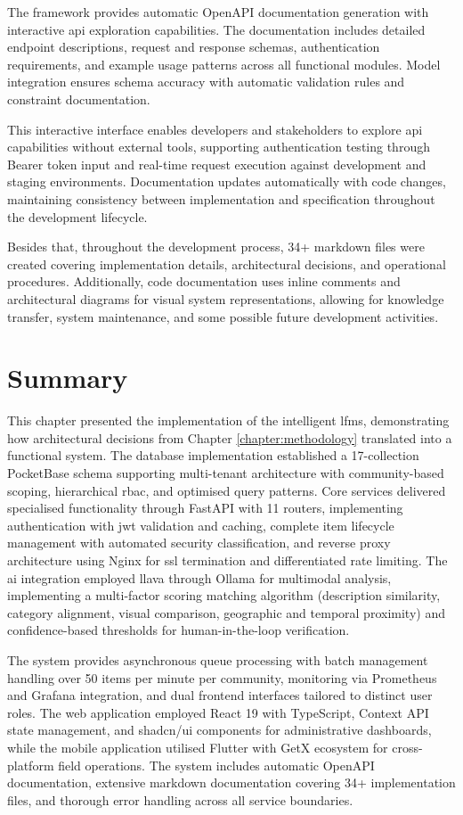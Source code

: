 The framework provides automatic OpenAPI documentation generation with interactive \ac{api} exploration capabilities. The documentation includes detailed endpoint descriptions, request and response schemas, authentication requirements, and example usage patterns across all functional modules. Model integration ensures schema accuracy with automatic validation rules and constraint documentation.

This interactive interface enables developers and stakeholders to explore \ac{api} capabilities without external tools, supporting authentication testing through Bearer token input and real-time request execution against development and staging environments. Documentation updates automatically with code changes, maintaining consistency between implementation and specification throughout the development lifecycle.

Besides that, throughout the development process, 34+ markdown files were created covering implementation details, architectural decisions, and operational procedures. Additionally, code documentation uses inline comments and architectural diagrams for visual system representations, allowing for knowledge transfer, system maintenance, and some possible future development activities.

\section{Summary} \label{section:implementation_summary}

This chapter presented the implementation of the intelligent \ac{lfms}, demonstrating how architectural decisions from Chapter \ref{chapter:methodology} translated into a functional system. The database implementation established a 17-collection PocketBase schema supporting multi-tenant architecture with community-based scoping, hierarchical \ac{rbac}, and optimised query patterns. Core services delivered specialised functionality through FastAPI with 11 routers, implementing authentication with \ac{jwt} validation and caching, complete item lifecycle management with automated security classification, and reverse proxy architecture using Nginx for \ac{ssl} termination and differentiated rate limiting. The \ac{ai} integration employed \ac{llava} through Ollama for multimodal analysis, implementing a multi-factor scoring matching algorithm (description similarity, category alignment, visual comparison, geographic and temporal proximity) and confidence-based thresholds for human-in-the-loop verification.

The system provides asynchronous queue processing with batch management handling over 50 items per minute per community, monitoring via Prometheus and Grafana integration, and dual frontend interfaces tailored to distinct user roles. The web application employed React 19 with TypeScript, Context API state management, and shadcn/ui components for administrative dashboards, while the mobile application utilised Flutter with GetX ecosystem for cross-platform field operations. The system includes automatic OpenAPI documentation, extensive markdown documentation covering 34+ implementation files, and thorough error handling across all service boundaries.